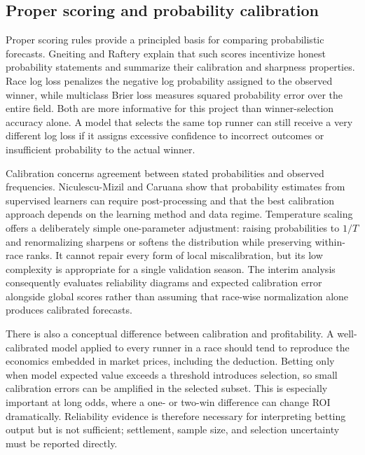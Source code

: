 \subsection{Proper scoring and probability calibration}\label{sec:lit-calibration}
Proper scoring rules provide a principled basis for comparing probabilistic forecasts. Gneiting and Raftery explain that such scores incentivize honest probability statements and summarize their calibration and sharpness properties\cite{gneiting2007}. Race log loss penalizes the negative log probability assigned to the observed winner, while multiclass Brier loss measures squared probability error over the entire field. Both are more informative for this project than winner-selection accuracy alone. A model that selects the same top runner can still receive a very different log loss if it assigns excessive confidence to incorrect outcomes or insufficient probability to the actual winner.

Calibration concerns agreement between stated probabilities and observed frequencies. Niculescu-Mizil and Caruana show that probability estimates from supervised learners can require post-processing and that the best calibration approach depends on the learning method and data regime\cite{niculescu2005}. Temperature scaling offers a deliberately simple one-parameter adjustment: raising probabilities to $1/T$ and renormalizing sharpens or softens the distribution while preserving within-race ranks. It cannot repair every form of local miscalibration, but its low complexity is appropriate for a single validation season. The interim analysis consequently evaluates reliability diagrams and expected calibration error alongside global scores rather than assuming that race-wise normalization alone produces calibrated forecasts.

There is also a conceptual difference between calibration and profitability. A well-calibrated model applied to every runner in a race should tend to reproduce the economics embedded in market prices, including the deduction. Betting only when model expected value exceeds a threshold introduces selection, so small calibration errors can be amplified in the selected subset. This is especially important at long odds, where a one- or two-win difference can change ROI dramatically. Reliability evidence is therefore necessary for interpreting betting output but is not sufficient; settlement, sample size, and selection uncertainty must be reported directly.

